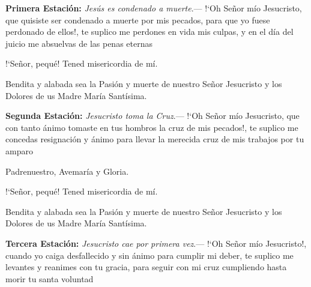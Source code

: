\textbf{Primera Estación:} \textit{Jesús es condenado a muerte}.--- {!`}Oh Señor mío Jesucristo, que quisiste ser condenado a muerte por mis pecados, 
para que yo fuese perdonado de ellos!, te suplico me perdones en vida mis culpas, y en el día del juicio me absuelvas de las penas eternas

\vspace{2mm}

\begin{otherlanguage}{latin}
      

      \vspace{1mm}

      

      \vspace{1mm}

      
\end{otherlanguage}

\vspace{1mm}

{!`}Señor, pequé! Tened misericordia de mí.

Bendita y alabada sea la Pasión y muerte de nuestro Señor Jesucristo y los Dolores de us Madre María Santísima.

\vspace{2mm}

\textbf{Segunda Estación:} \textit{Jesucristo toma la Cruz}.--- {!`}Oh Señor mío Jesucristo, que con tanto ánimo tomaste en tus hombros la cruz de mis pecados!, 
te suplico me concedas resignación y ánimo para llevar la merecida cruz de mis trabajos por tu amparo

\vspace{2mm}

Padrenuestro, Avemaría y Gloria.

{!`}Señor, pequé! Tened misericordia de mí.

Bendita y alabada sea la Pasión y muerte de nuestro Señor Jesucristo y los Dolores de us Madre María Santísima.

\vspace{2mm}

\textbf{Tercera Estación:} \textit{Jesucristo cae por primera vez}.--- {!`}Oh Señor mío Jesucristo!, cuando yo caiga desfallecido y sin ánimo para cumplir mi deber,
te suplico me levantes y reanimes con tu gracia, para seguir con mi cruz cumpliendo hasta morir tu santa voluntad

\vspace{2mm}

